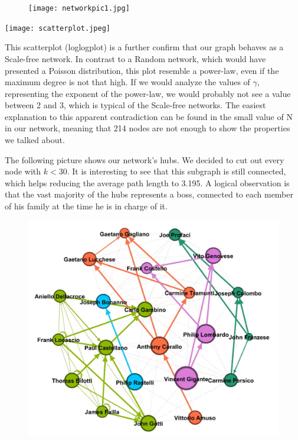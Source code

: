 \documentclass{article}
\begin{document}
\begin{figure}[t!]
\vspace{-250pt}
\centering
\texttt{[image: networkpic1.jpg]}
\advance\leftskip-3.52cm
\end{figure}



\noindent\begin{minipage}{0.5\textwidth}
\advance\leftskip-3.3cm
\texttt{[image: scatterplot.jpeg]}
\end{minipage}%
\hfill%
\begin{minipage}{0.6\textwidth}\raggedleft
This scatterplot (loglogplot) is a further confirm that our graph behaves as a Scale-free network. In contrast to a Random network, which would have presented a Poisson distribution, this plot resemble a power-law, even if the maximum degree is not that high. If we would analyze the values of $\gamma$, representing the exponent of the power-law, we would probably not see a value between 2 and 3, which is typical of the Scale-free networks. The easiest explanation to this apparent contradiction can be found in the small value of N in our network, meaning that 214 nodes are not enough to show the properties we talked about.
\end{minipage}



\vspace{30pt}
\noindent
The following picture shows our network's hubs. We decided to cut out every node with $k<30$. It is interesting to see that this subgraph is still connected, which helps reducing the average path length to 3.195. A logical observation is that the vast majority of the hubs represents a boss, connected to each member of his family at the time he is in charge of it. 



\begin{figure}[!ht]
\centering
\includegraphics[width=350pt]{fullhubs.jpg}
\advance\leftskip-0.6cm
\end{figure}
\end{document}

